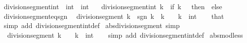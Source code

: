 \begin{isabellebody}
\isanewline
{}\isamarkupfalse%
\ division{\isacharunderscore}{\kern0pt}segment{\isacharunderscore}{\kern0pt}int\ {\isacharcolon}{\kern0pt}{\isacharcolon}{\kern0pt}\ {\isachardoublequoteopen}int\ {\isasymRightarrow}\ int{\isachardoublequoteclose}\isanewline
\ \ \ {\isachardoublequoteopen}division{\isacharunderscore}{\kern0pt}segment{\isacharunderscore}{\kern0pt}int\ k\ {\isacharequal}{\kern0pt}\ {\isacharparenleft}{\kern0pt}if\ k\ {\isasymge}\ {}\ then\ {}\ else\ {\isacharminus}{\kern0pt}\ {}{\isacharparenright}{\kern0pt}{\isachardoublequoteclose}\isanewline
\isanewline
{}\isamarkupfalse%
\ division{\isacharunderscore}{\kern0pt}segment{\isacharunderscore}{\kern0pt}eq{\isacharunderscore}{\kern0pt}sgn{\isacharcolon}{\kern0pt}\isanewline
\ \ {\isachardoublequoteopen}division{\isacharunderscore}{\kern0pt}segment\ k\ {\isacharequal}{\kern0pt}\ sgn\ k{\isachardoublequoteclose}\ \ {\isachardoublequoteopen}k\ {\isasymnoteq}\ {}{\isachardoublequoteclose}\ \ k\ {\isacharcolon}{\kern0pt}{\isacharcolon}{\kern0pt}\ int\isanewline
%
\isadelimproof
\ \ %
\endisadelimproof
%
\isatagproof
{}\isamarkupfalse%
\ that\ \isamarkupfalse%
\ {\isacharparenleft}{\kern0pt}simp\ add{\isacharcolon}{\kern0pt}\ division{\isacharunderscore}{\kern0pt}segment{\isacharunderscore}{\kern0pt}int{\isacharunderscore}{\kern0pt}def{\isacharparenright}{\kern0pt}%
\endisatagproof
{\isafoldproof}%
%
\isadelimproof
\isanewline
%
\endisadelimproof
\isanewline
{}\isamarkupfalse%
\ abs{\isacharunderscore}{\kern0pt}division{\isacharunderscore}{\kern0pt}segment\ {\isacharbrackleft}{\kern0pt}simp{\isacharbrackright}{\kern0pt}{\isacharcolon}{\kern0pt}\isanewline
\ \ {\isachardoublequoteopen}{\isasymbar}division{\isacharunderscore}{\kern0pt}segment\ k{\isasymbar}\ {\isacharequal}{\kern0pt}\ {}{\isachardoublequoteclose}\ \ k\ {\isacharcolon}{\kern0pt}{\isacharcolon}{\kern0pt}\ int\isanewline
%
\isadelimproof
\ \ %
\endisadelimproof
%
\isatagproof
{}\isamarkupfalse%
\ {\isacharparenleft}{\kern0pt}simp\ add{\isacharcolon}{\kern0pt}\ division{\isacharunderscore}{\kern0pt}segment{\isacharunderscore}{\kern0pt}int{\isacharunderscore}{\kern0pt}def{\isacharparenright}{\kern0pt}%
\endisatagproof
{\isafoldproof}%
%
\isadelimproof
\isanewline
%
\endisadelimproof
\isanewline
{}\isamarkupfalse%
\ abs{\isacharunderscore}{\kern0pt}mod{\isacharunderscore}{\kern0pt}less{\isacharcolon}{\kern0pt}\isanewline

\end{isabellebody}
